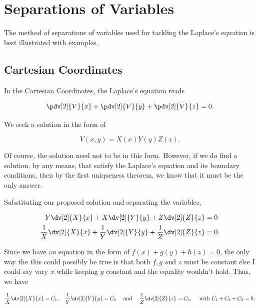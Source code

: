 \documentclass[a4paper,12pt]{report}
\begin{document}
	\section{Separations of Variables}
	
	The method of separations of variables used for tackling the Laplace's equation is best illustrated with examples.

	\subsection{Cartesian Coordinates}

	In the Cartesian Coordinates, the Laplace's equation reads
		
		\begin{equation}
			\pdv[2]{V}{x} + \pdv[2]{V}{y} + \pdv[2]{V}{z} = 0. 
		\end{equation}
				
		We seek a solution in the form of 
		
		\begin{equation}
			V(x,y) = X(x)Y(y)Z(z).
		\end{equation}
		
		Of course, the solution need not to be in this form. However, if we do find a solution, by any means, that satisfy the Laplace's equation and its boundary conditions, then by the first uniqueness theorem, we know that it must be the only answer. 
		
		Substituting our proposed solution and separating the variables,
		
		\begin{equation}
			\begin{aligned}
				Y \dv[2]{X}{x} + X \dv[2]{Y}{y} + Z \dv[2]{Z}{z} &= 0 \\
				\frac{1}{X} \dv[2]{X}{x} + \frac{1}{Y} \dv[2]{Y}{y} + \frac{1}{Z} \dv[2]{Z}{z} &= 0. 
			\end{aligned}
		\end{equation}
		
		Since we have an equation in the form of \(f(x) + g(y) + h(z) = 0\), the only way the this could possibly be true is that both  \(f,g \text{ and }  z\) must be constant else I could say vary \(x\) while keeping \(y\) constant and the equality wouldn't hold. Thus, we have
		
		\begin{equation}
			\frac{1}{X} \dv[2]{X}{x} = C_1, ~~~\frac{1}{Y} \dv[2]{Y}{y} = C_2 ~~~ \text{ and } ~~~ \frac{1}{Z} \dv[2]{Z}{z} = C_3, ~~~ \text{ with }  C_1 + C_2 + C_3 = 0.
		\end{equation}
\end{document}
